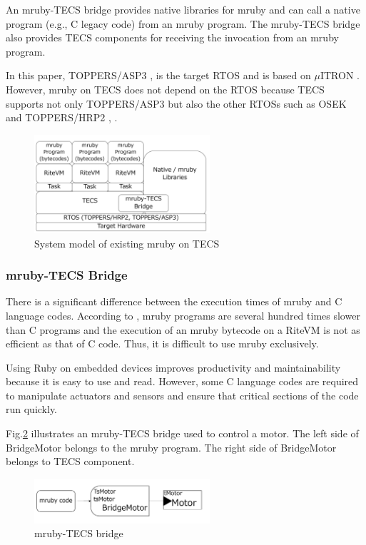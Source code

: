 \documentclass[JIP]{ipsj_v2/UTF8/ipsj}
\begin{document}
An mruby-TECS bridge provides native libraries for mruby and can call a native program (e.g., C legacy code) from an mruby program.
The mruby-TECS bridge also provides TECS components for receiving the invocation from an mruby program.

In this paper, TOPPERS/ASP3 \cite{par:ASP}, \cite{url:ASP} is the target RTOS and is based on $\mu$ITRON \cite{par:microITRON} .
However, mruby on TECS does not depend on the RTOS because TECS supports not only TOPPERS/ASP3 but also the other RTOSs such as OSEK \cite{par:OSEK} and TOPPERS/HRP2 \cite{url:HRP2}, \cite{par:hr-tecs}.

\begin{figure}[t]
    \centering
    \includegraphics[width=6.5cm,clip]{figure/mrubyonTECS.pdf}
\caption{System model of existing mruby on TECS}
\label{fig:mrubyonTECS}
\end{figure}

\subsubsection{mruby-TECS Bridge}
There is a significant difference between the execution times of mruby and C language codes.
According to  \cite{par:mrubyonTECS}, mruby programs are several hundred times slower than C programs and the execution of an mruby bytecode on a RiteVM is not as efficient as that of C code.
Thus, it is difficult to use mruby exclusively.

Using Ruby on embedded devices improves productivity and maintainability because it is easy to use and read.
However, some C language codes are required to manipulate actuators and sensors and ensure that critical sections of the code run quickly.

Fig.\ref{fig:mrubyTECSbridge} illustrates an mruby-TECS bridge used to control a motor.
The left side of BridgeMotor belongs to the mruby program.
The right side of BridgeMotor belongs to TECS component.

\begin{figure}[t]
    \centering
    \includegraphics[width=6.5cm,clip]{figure/mrubyTECSbridge.pdf}
\caption{mruby-TECS bridge}
\label{fig:mrubyTECSbridge}
\end{figure}
\end{document}
